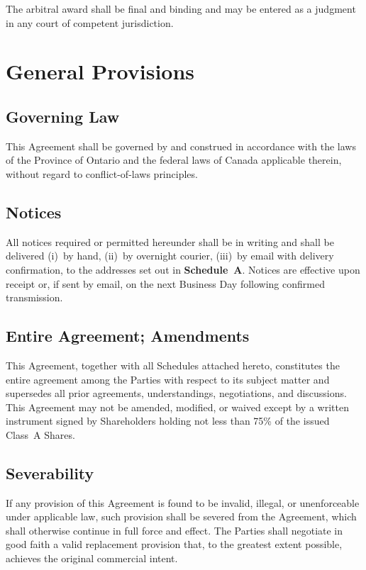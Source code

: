 \noindent The arbitral award shall be final and binding and may be entered as a
judgment in any court of competent jurisdiction.

\section{General Provisions}
\label{sec:general}

\subsection{Governing Law}

This Agreement shall be governed by and construed in accordance with the laws
of the Province of Ontario and the federal laws of Canada applicable therein,
without regard to conflict-of-laws principles.

\subsection{Notices}

All notices required or permitted hereunder shall be in writing and shall be
delivered (i)~by hand, (ii)~by overnight courier, (iii)~by email with delivery
confirmation, to the addresses set out in \textbf{Schedule~A}.  Notices are
effective upon receipt or, if sent by email, on the next Business Day following
confirmed transmission.

\subsection{Entire Agreement; Amendments}

This Agreement, together with all Schedules attached hereto, constitutes the
entire agreement among the Parties with respect to its subject matter and
supersedes all prior agreements, understandings, negotiations, and discussions.
This Agreement may not be amended, modified, or waived except by a written
instrument signed by Shareholders holding not less than 75\% of the issued
Class~A Shares.

\subsection{Severability}

If any provision of this Agreement is found to be invalid, illegal, or
unenforceable under applicable law, such provision shall be severed from the
Agreement, which shall otherwise continue in full force and effect.  The Parties
shall negotiate in good faith a valid replacement provision that, to the greatest
extent possible, achieves the original commercial intent.

